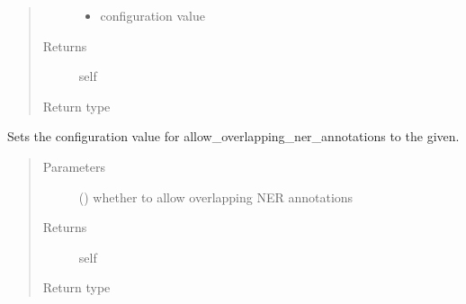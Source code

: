 \documentclass[letterpaper,10pt,english]{sphinxmanual}
\begin{document}
\begin{fulllineitems}
\begin{fulllineitems}
\begin{quote}
\begin{description}
\begin{itemize}
\item {} 
\sphinxAtStartPar
{} \textendash{} configuration value

\end{itemize}

\item[{Returns}] \leavevmode
\sphinxAtStartPar
self

\item[{Return type}] \leavevmode
\sphinxAtStartPar
{\hyperref[\detokenize{autoapi/pine/client/models/index:pine.client.models.CollectionBuilder}]{}}

\end{description}\end{quote}

\end{fulllineitems}


\begin{fulllineitems}
\label{\detokenize{autoapi/pine/client/models/index:pine.client.models.CollectionBuilder.allow_overlapping_ner_annotations}}
\sphinxAtStartPar
Sets the configuration value for allow\_overlapping\_ner\_annotations to the given.
\begin{quote}\begin{description}
\item[{Parameters}] \leavevmode
\sphinxAtStartPar
{} () \textendash{} whether to allow overlapping NER annotations

\item[{Returns}] \leavevmode
\sphinxAtStartPar
self

\item[{Return type}] \leavevmode
\sphinxAtStartPar
{\hyperref[\detokenize{autoapi/pine/client/models/index:pine.client.models.CollectionBuilder}]{}}


\end{description}
\end{quote}
\end{fulllineitems}
\end{fulllineitems}
\end{document}
